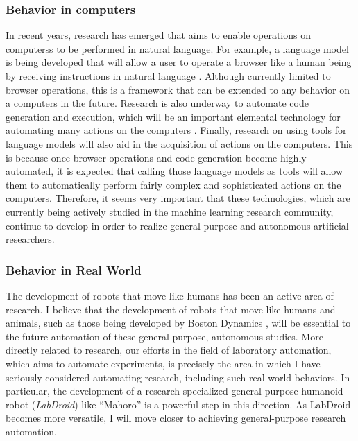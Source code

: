 \documentclass{book}
\begin{document}
\subsubsection{Behavior in computers}
In recent years, research has emerged that aims to enable operations on computerss to be performed in natural language. For example, a language model is being developed that will allow a user to operate a browser like a human being by receiving instructions in natural language \cite{nakano2021webgpt}. Although currently limited to browser operations, this is a framework that can be extended to any behavior on a computers in the future. Research is also underway to automate code generation and execution, which will be an important elemental technology for automating many actions on the computers \cite{gulwani2017program}. Finally, research on using tools for language models \cite{mialon2023augmented} will also aid in the acquisition of actions on the computers. This is because once browser operations and code generation become highly automated, it is expected that calling those language models as tools will allow them to automatically perform fairly complex and sophisticated actions on the computers. Therefore, it seems very important that these technologies, which are currently being actively studied in the machine learning research community, continue to develop in order to realize general-purpose and autonomous artificial researchers.

\subsubsection{Behavior in Real World}
The development of robots that move like humans has been an active area of research. I believe that the development of robots that move like humans and animals, such as those being developed by Boston Dynamics \cite{kuindersma2016optimization}, will be essential to the future automation of these general-purpose, autonomous studies. More directly related to research, our efforts in the field of laboratory automation, which aims to automate experiments, is precisely the area in which I have seriously considered automating research, including such real-world behaviors. In particular, the development of a research specialized general-purpose humanoid robot (\textit{LabDroid}) like ``Mahoro'' \cite{yachie2017robotic} is a powerful step in this direction. As LabDroid becomes more versatile, I will move closer to achieving general-purpose research automation.
\end{document}
